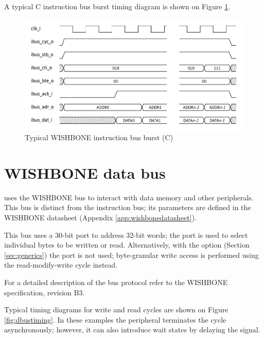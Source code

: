 \documentclass[a4paper,12pt,twoside,extrafontsizes]{memoir}
\begin{document}
A typical \lxp{}C instruction bus burst timing diagram is shown on Figure \ref{fig:ibustiming}.

\begin{figure}[htbp]
	\centering
	\includegraphics[scale=0.786]{images/ibustiming.pdf}
	\caption{Typical WISHBONE instruction bus burst (\lxp{}C)}
	\label{fig:ibustiming}
\end{figure}

\section{WISHBONE data bus}

\lxp{} uses the WISHBONE bus to interact with data memory and other peripherals. This bus is distinct from the instruction bus; its parameters are defined in the WISHBONE datasheet (Appendix \ref{app:wishbonedatasheet}).

This bus uses a 30-bit  port to address 32-bit words; the  port is used to select individual bytes to be written or read. Alternatively, with the  option (Section \ref{sec:generics}) the  port is not used; byte-granular write access is performed using the read-modify-write cycle instead.

For a detailed description of the bus protocol refer to the WISHBONE specification, revision B3.

Typical timing diagrams for write and read cycles are shown on Figure \ref{fig:dbustiming}. In these examples the peripheral terminates the cycle asynchronously; however, it can also introduce wait states by delaying the  signal.
\end{document}
